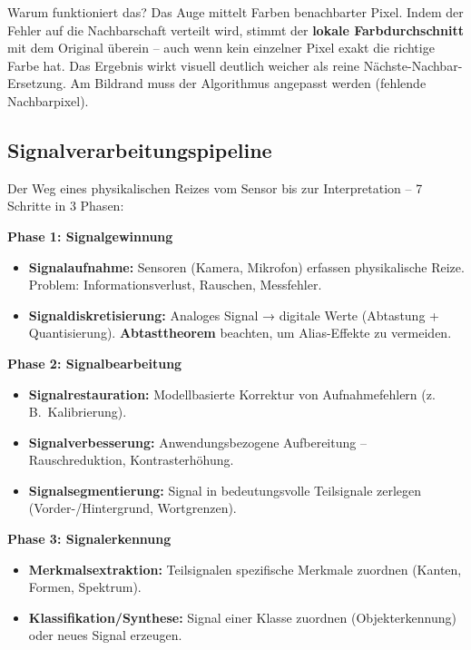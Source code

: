 \documentclass[12pt, a4paper]{article}
\begin{document}
\begin{notebox}{Warum funktioniert das?}
Das Auge mittelt Farben benachbarter Pixel. Indem der Fehler auf die Nachbarschaft verteilt wird, stimmt der \textbf{lokale Farbdurchschnitt} mit dem Original überein -- auch wenn kein einzelner Pixel exakt die richtige Farbe hat. Das Ergebnis wirkt visuell deutlich weicher als reine Nächste-Nachbar-Ersetzung. Am Bildrand muss der Algorithmus angepasst werden (fehlende Nachbarpixel).
\end{notebox}

\subsection{Signalverarbeitungspipeline}

Der Weg eines physikalischen Reizes vom Sensor bis zur Interpretation -- 7 Schritte in 3 Phasen:

\textbf{Phase 1: Signalgewinnung}
\begin{itemize}
  \item \textbf{Signalaufnahme:} Sensoren (Kamera, Mikrofon) erfassen physikalische Reize. Problem: Informationsverlust, Rauschen, Messfehler.
  \item \textbf{Signaldiskretisierung:} Analoges Signal → digitale Werte (Abtastung + Quantisierung). \textbf{Abtasttheorem} beachten, um Alias-Effekte zu vermeiden.
\end{itemize}

\textbf{Phase 2: Signalbearbeitung}
\begin{itemize}
  \item \textbf{Signalrestauration:} Modellbasierte Korrektur von Aufnahmefehlern (z.\,B.\ Kalibrierung).
  \item \textbf{Signalverbesserung:} Anwendungsbezogene Aufbereitung -- Rauschreduktion, Kontrasterhöhung.
  \item \textbf{Signalsegmentierung:} Signal in bedeutungsvolle Teilsignale zerlegen (Vorder-/Hintergrund, Wortgrenzen).
\end{itemize}

\textbf{Phase 3: Signalerkennung}
\begin{itemize}
  \item \textbf{Merkmalsextraktion:} Teilsignalen spezifische Merkmale zuordnen (Kanten, Formen, Spektrum).
  \item \textbf{Klassifikation/Synthese:} Signal einer Klasse zuordnen (Objekterkennung) oder neues Signal erzeugen.
\end{itemize}
\end{document}

